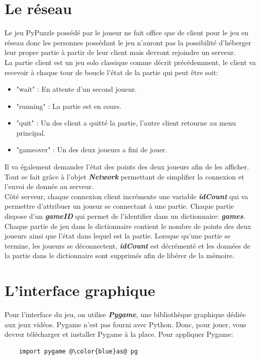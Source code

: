 \documentclass[a4paper]{report}
\begin{document}
\section{Le réseau}
Le jeu PyPuzzle possédé par le joueur ne fait office que de client pour le jeu en réseau donc les personnes possédant le jeu n'auront pas la possibilité d'héberger leur propre partie à partir de leur client mais devront rejoindre un serveur. \\

La partie client est un jeu solo classique comme décrit précédemment, le client va recevoir à chaque tour de boucle l'état de la partie qui peut être soit:
\begin{itemize}
	\item "wait" : En attente d'un second joueur.
	\item "running" : La partie est en cours.
	\item "quit" : Un des client a quitté la partie, l'autre client retourne au menu principal.
	\item "gameover" : Un des deux joueurs a fini de jouer.
\end{itemize}
Il va également demander l'état des points des deux joueurs afin de les afficher. Tout se fait grâce à l'objet \textbf{\textit{Network}} permettant de simplifier la connexion et l'envoi de donnée au serveur.\\

Côté serveur, chaque connexion client incrémente une variable \textbf{\textit{idCount}} qui va permettre d'attribuer un joueur se connectant à une partie. Chaque partie dispose d'un \textbf{\textit{gameID}} qui permet de l'identifier dans un dictionnaire: \textbf{\textit{games}}. Chaque partie de jeu dans le dictionnaire contient le nombre de points des deux joueurs ainsi que l'état dans lequel est la partie. Lorsque qu'une partie se termine, les joueurs se déconnectent, \textbf{\textit{idCount}} est décrémenté et les données de la partie dans le dictionnaire sont supprimés afin de libérer de la mémoire.


\section{L'interface graphique}
Pour l'interface du jeu, on utilise \textbf{\textit{Pygame}}, une bibliothèque graphique dédiée aux jeux vidéos. 
Pygame n'est pas fourni avec Python. Donc, pour jouer, vous devrez télécharger et installer Pygame à la place. Pour appliquer Pygame:
\begin{lstlisting}
    import pygame @\color{blue}as@ pg
\end{lstlisting}
\end{document}
